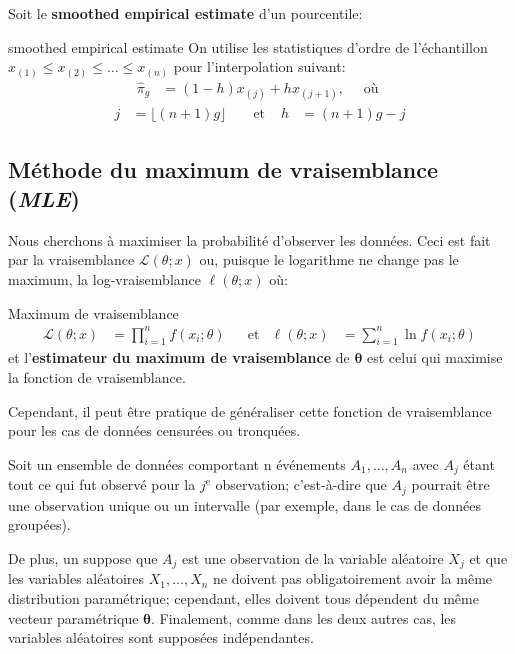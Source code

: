 \documentclass[10pt, french]{article}
\begin{document}
\begin{multicols*}{3}
Soit le \guillemotleft \textbf{smoothed empirical estimate} \guillemotright d'un pourcentile:

\begin{algo}{\guillemotleft smoothed empirical estimate \guillemotright}
On utilise les statistiques d'ordre de l'échantillon $x_{(1)} \le x_{(2)} \le \dots \le x_{(n)}$ pour l'interpolation suivant:
\begin{align*}
	\hat\pi_{g}
	&=	(1 - h)x_{(j)} + h x_{(j + 1)}, \quad \text{ où }	
\end{align*}
\begin{align*}
	j
	&=	\lfloor (n + 1) g \rfloor	&
	&\text{ et }	&
	h
	&=	(n + 1) g - j
\end{align*}
\end{algo}


\subsection*{Méthode du maximum de vraisemblance (\emph{MLE})}

Nous cherchons à maximiser la probabilité d'observer les données.
Ceci est fait par la vraisemblance $\mathcal{L}(\theta; x)$ ou, puisque le logarithme ne change pas le maximum, la log-vraisemblance $\ell(\theta; x)$ où:

\begin{algo}{Maximum de vraisemblance}
\setlength{\mathindent}{-1cm}
\begin{align*}
	\mathcal{L}(\theta; x)
	&=	\prod_{i = 1}^{n}	f(x_{i}; \theta)	&
	&\text{et}	&
	\ell(\theta; x)
	&=	\sum_{i = 1}^{n} \ln	f(x_{i}; \theta)	
\end{align*}
\setlength{\mathindent}{1cm}
et l'\textbf{estimateur du maximum de vraisemblance} de $\bm\theta$ est celui qui maximise la fonction de vraisemblance.
\end{algo}
Cependant, il peut être pratique de généraliser cette fonction de vraisemblance pour les cas de données censurées ou tronquées.

Soit un ensemble de données comportant n événements $A_{1}, \dots, A_{n}$ avec $A_{j}$ étant tout ce qui fut observé pour la $j^{\text{e}}$ observation; c'est-à-dire que $A_{j}$ pourrait être une observation unique ou un intervalle (par exemple, dans le cas de données groupées).

De plus, un suppose que $A_{j}$ est une observation de la variable aléatoire $X_{j}$ et que les variables aléatoires $X_{1}, \dots, X_{n}$ ne doivent pas obligatoirement avoir la même distribution paramétrique; cependant, elles doivent tous dépendent du même vecteur paramétrique $\bm\theta$.
Finalement, comme dans les deux autres cas, les variables aléatoires sont supposées indépendantes.


\end{multicols*}
\end{document}
